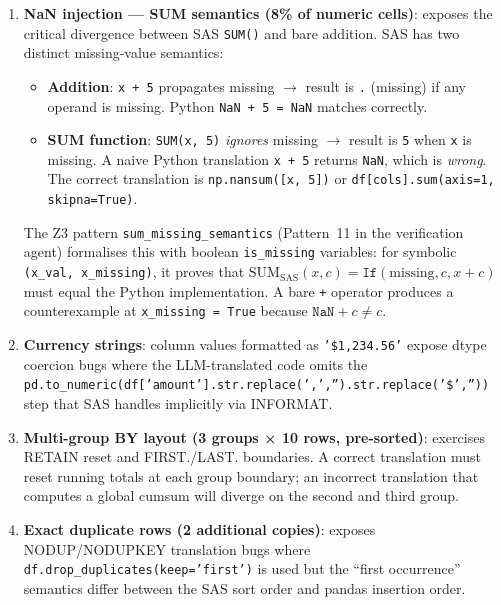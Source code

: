 \begin{enumerate}
  \item \textbf{NaN injection — SUM semantics (8\% of numeric cells)}: exposes
    the critical divergence between SAS \texttt{SUM()} and bare addition.
    SAS has two distinct missing-value semantics:
    \begin{itemize}
      \item \textbf{Addition}: \texttt{x + 5} propagates missing $\rightarrow$
        result is \texttt{.} (missing) if any operand is missing.
        Python \texttt{NaN + 5 = NaN} matches correctly.
      \item \textbf{SUM function}: \texttt{SUM(x, 5)} \emph{ignores} missing
        $\rightarrow$ result is \texttt{5} when \texttt{x} is missing.
        A naive Python translation \texttt{x + 5} returns \texttt{NaN},
        which is \emph{wrong}. The correct translation is
        \texttt{np.nansum([x, 5])} or \texttt{df[cols].sum(axis=1, skipna=True)}.
    \end{itemize}
    The Z3 pattern \texttt{sum\_missing\_semantics} (Pattern~11 in the
    verification agent) formalises this with boolean \texttt{is\_missing}
    variables: for symbolic \texttt{(x\_val, x\_missing)}, it proves that
    $\text{SUM}_{\text{SAS}}(x, c) = \texttt{If}(\text{missing}, c, x + c)$
    must equal the Python implementation. A bare \texttt{+} operator produces a
    counterexample at \texttt{x\_missing = True} because
    $\texttt{NaN} + c \neq c$.

  \item \textbf{Currency strings}: column values formatted as \texttt{'\$1,234.56'}
    expose dtype coercion bugs where the LLM-translated code omits the
    \texttt{pd.to\_numeric(df['amount'].str.replace(',','').str.replace('\$',''))}
    step that SAS handles implicitly via INFORMAT.

  \item \textbf{Multi-group BY layout (3 groups × 10 rows, pre-sorted)}:
    exercises RETAIN reset and FIRST./LAST. boundaries. A correct translation
    must reset running totals at each group boundary; an incorrect translation
    that computes a global cumsum will diverge on the second and third group.

  \item \textbf{Exact duplicate rows (2 additional copies)}: exposes
    NODUP/NODUPKEY translation bugs where
    \texttt{df.drop\_duplicates(keep='first')} is used but the ``first
    occurrence'' semantics differ between the SAS sort order and pandas
    insertion order.


\end{enumerate}
